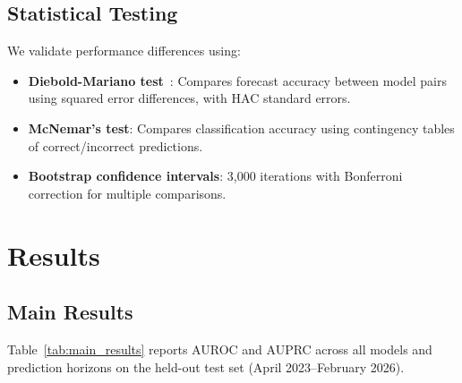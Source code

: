 \documentclass[journal]{IEEEtran}
\begin{document}
\subsection{Statistical Testing}

We validate performance differences using:
\begin{itemize}
    \item \textbf{Diebold-Mariano test}~\cite{diebold2002comparing}: Compares forecast accuracy between model pairs using squared error differences, with HAC standard errors.
    \item \textbf{McNemar's test}: Compares classification accuracy using contingency tables of correct/incorrect predictions.
    \item \textbf{Bootstrap confidence intervals}: 3{,}000 iterations with Bonferroni correction for multiple comparisons.
\end{itemize}


\section{Results}

\subsection{Main Results}

Table~\ref{tab:main_results} reports AUROC and AUPRC across all models and prediction horizons on the held-out test set (April 2023--February 2026).
\end{document}
